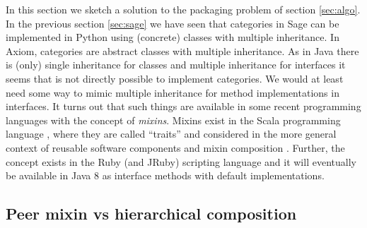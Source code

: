 \documentclass{llncs}
\begin{document}

In this section we sketch a solution to the packaging problem of
section \ref{sec:algo}.  In the previous section \ref{sec:sage} we
have seen that categories in Sage can be implemented in Python using
(concrete) classes with multiple inheritance. In Axiom, categories are
abstract classes with multiple inheritance.  As in Java there is
(only) single inheritance for classes and multiple inheritance for
interfaces it seems that is not directly possible to implement categories.
%
%
We would at least need some way to mimic multiple inheritance for
method implementations in interfaces. It turns out that such things
are available in some recent programming languages with the concept
of {\em mixins}. Mixins exist in the Scala programming language
\cite{Odersky:2003}, where they are called ``traits'' and considered
in the more general context of reusable software components and mixin
composition \cite{Odersky:2005}. Further, the concept exists in the
Ruby (and JRuby) \cite{Matsumo:1995} scripting language and it will
eventually be available in Java 8 as interface methods with default
implementations.


\subsection{Peer mixin vs hierarchical composition} %
\end{document}

